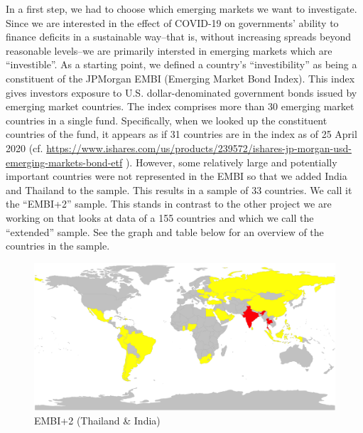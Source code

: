\documentclass[11pt,]{article}
\begin{document}
In a first step, we had to choose which emerging markets we want to
investigate. Since we are interested in the effect of COVID-19 on
governments' ability to finance deficits in a sustainable way--that is,
without increasing spreads beyond reasonable levels--we are primarily
intersted in emerging markets which are ``investible''. As a starting
point, we defined a country's ``investibility'' as being a constituent
of the JPMorgan EMBI (Emerging Market Bond Index). This index gives
investors exposure to U.S. dollar-denominated government bonds issued by
emerging market countries. The index comprises more than 30 emerging
market countries in a single fund. Specifically, when we looked up the
constituent countries of the fund, it appears as if 31 countries are in
the index as of 25 April 2020 (cf.
\href{www.ishares.com/us/products/239572/ishares-jp-morgan-usd-emerging-markets-bond-etf}{https://www.ishares.com/us/products/239572/ishares-jp-morgan-usd-emerging-markets-bond-etf}
). However, some relatively large and potentially important countries
were not represented in the EMBI so that we added India and Thailand to
the sample. This results in a sample of 33 countries. We call it the
``EMBI+2'' sample. This stands in contrast to the other project we are
working on that looks at data of a 155 countries and which we call the
``extended'' sample. See the graph and table below for an overview of
the countries in the sample.

\begin{figure}
\centering
\includegraphics{reportfigures/EMBI+2.png}
\caption{EMBI+2 (Thailand \& India)}
\end{figure}
\end{document}
